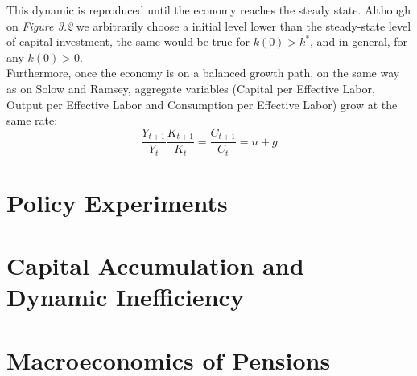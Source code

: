 This dynamic is reproduced until the economy reaches the steady state. Although on \textit{Figure 3.2} we arbitrarily choose a initial level lower than the steady-state level of capital investment, the same would be true for $k(0)>k^*$, and in general, for any $k(0)>0$. \\

Furthermore, once the economy is on a balanced growth path, on the same way as on Solow and Ramsey, aggregate variables (Capital per Effective Labor, Output per Effective Labor and Consumption per Effective Labor) grow at the same rate:
$$\dfrac{Y_{t+1}}{Y_t}\dfrac{K_{t+1}}{K_t}=\dfrac{C_{t+1}}{C_t}=n+g$$

\section{Policy Experiments}
\section{Capital Accumulation and Dynamic Inefficiency}
\section{Macroeconomics of Pensions}